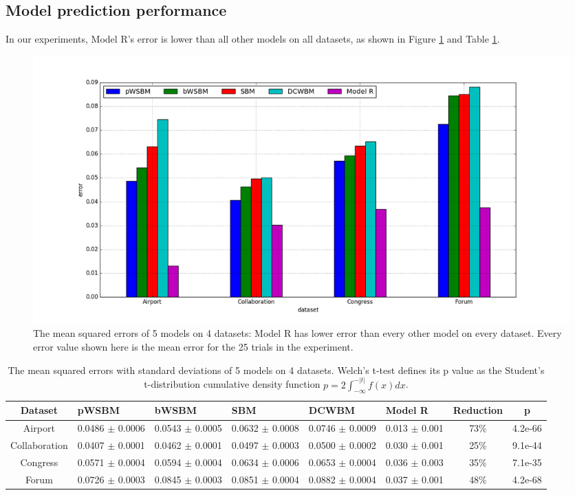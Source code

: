 \documentclass[12pt]{WSUThesis}
\theoremstyle{definition}
\begin{document}
\subsection{Model prediction performance}
In our experiments,
Model R's error is lower than all other models on all datasets,
as shown in Figure \ref{fig:errors} and Table \ref{tab:errors}.
\begin{figure}[!ht]\centering
	\includegraphics[width=1\textwidth]{link-weight-errors}
	\caption{
		The mean squared errors of 5 models on 4 datasets:
		Model R has lower error than every other model on every dataset.
		Every error value shown here is the mean error for the 25 trials in the experiment.
	}
	\label{fig:errors}
\end{figure}
\begin{table}[!htb]\centering
	\caption{
		The mean squared errors with standard deviations of 5 models on 4 datasets.
		Welch's t-test defines its p value as the Student's t-distribution cumulative density function $ p = 2 \int_{-\infty}^{-|t|} f(x) dx $.
	}
	\begin{tabularx}{\textwidth}{|c|X|X|X|X|X|c|c|} \hline \rowcolor{blue!30}
		Dataset & pWSBM & bWSBM & SBM & DCWBM & Model R & Reduction & p \\ \hline
		Airport & 0.0486 $ \pm $ 0.0006 & 0.0543 $ \pm $ 0.0005 & 0.0632 $ \pm $ 0.0008 & 0.0746 $ \pm $ 0.0009 & 0.013 $ \pm $ 0.001 & 73\% & 4.2e-66 \\ \hline
		Collaboration & 0.0407 $ \pm $ 0.0001 & 0.0462 $ \pm $ 0.0001 & 0.0497 $ \pm $ 0.0003 & 0.0500 $ \pm $ 0.0002 & 0.030 $ \pm $ 0.001 & 25\% & 9.1e-44 \\ \hline
		Congress & 0.0571 $ \pm $ 0.0004 & 0.0594 $ \pm $ 0.0004 & 0.0634 $ \pm $ 0.0006 & 0.0653 $ \pm $ 0.0004 & 0.036 $ \pm $ 0.003 & 35\% & 7.1e-35 \\ \hline
		Forum & 0.0726 $ \pm $ 0.0003 & 0.0845 $ \pm $ 0.0003 & 0.0851 $ \pm $ 0.0004 & 0.0882 $ \pm $ 0.0004 & 0.037 $ \pm $ 0.001 & 48\% & 4.2e-68 \\ \hline
	\end{tabularx}
	\label{tab:errors}
\end{table}
\end{document}
